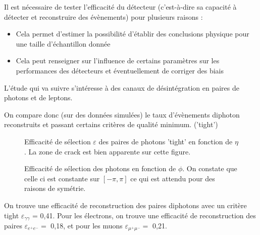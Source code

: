 \documentclass[11pt]{article} %
\begin{document}
Il est nécessaire de tester l'efficacité du détecteur (c'est-à-dire sa capacité à détecter et reconstruire des évènements) pour plusieurs raisons :

\begin{itemize}
\item{Cela permet d'estimer la possibilité d'établir des conclusions physique pour une taille d'échantillon donnée}
\item{Cela peut renseigner sur l'influence de certains paramètres sur les performances des détecteurs et éventuellement de corriger des biais}
\end{itemize}


L'étude qui va suivre s'intéresse à des canaux de désintégration en paires de photons et de leptons.

On compare donc (sur des données simulées) le taux d'évènements diphoton reconstruits et passant certains critères de qualité minimum. ('tight')

\begin{figure}[H]
\centering
  \caption{Efficacité de sélection $\varepsilon$ des paires de photons 'tight' en fonction de $\eta$. La zone de \og crack \fg est bien apparente sur cette figure. }
 \resizebox{.8\linewidth}{!}{}
\end{figure}


\begin{figure}[H]
\centering
  \caption{}
 \resizebox{.8\linewidth}{!}{}
  \caption{Efficacité de sélection des photons en fonction de $\phi$. On constate que celle ci est constante sur $[-\pi,\pi]$ ce qui est attendu pour des raisons de symétrie.}
\end{figure}

On trouve une efficacité de reconstruction des paires diphotons avec un critère tight $\varepsilon_{\gamma\gamma}$ = 0,41.
Pour les électrons, on trouve une efficacité de reconstruction des paires $\varepsilon_{e^+e^-} =$ 0,18, et pour les muons $\varepsilon_{\mu^+\mu^-} =$ 0,21.
\end{document}
